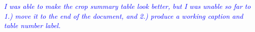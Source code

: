 \documentclass[11pt]{article}
\newcommand{\gmj}[1]{\textcolor{blue}{ \emph{\scriptsize  #1}} } %
\begin{document}


























\gmj{I was able to make the crop summary table look better, but I was unable so far to 1.) move it to the end of the document, and 2.) produce a working caption and table number label.}
\end{document}
